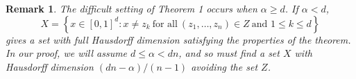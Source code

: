 \documentclass[usenames,dvipsnames]{article}
\theoremstyle{plain}
\theoremstyle{plain}
\newtheorem*{remark}{Remark}
\begin{document}
\begin{remark}
	The difficult setting of Theorem 1 occurs when $\alpha \geq d$. If $\alpha < d$,
	\[ X = \left\{ x \in [0,1]^d : x \neq z_k\ \text{for all}\ (z_1, \dots, z_n) \in Z\ \text{and $1 \leq k \leq d$} \right\} \]
	gives a set with full Hausdorff dimension satisfying the properties of the theorem. In our proof, we will assume $d \leq \alpha < dn$, and so must find a set $X$ with Hausdorff dimension $(dn - \alpha) / (n - 1)$ avoiding the set $Z$.
\end{remark}


%



%
\end{document}
